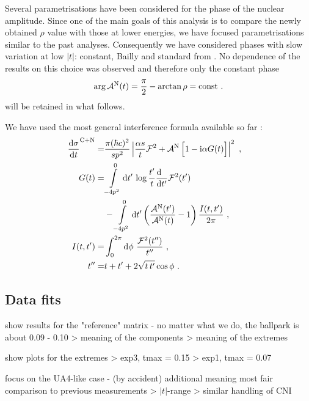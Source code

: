 Several parametrisations have been considered for the phase of the nuclear amplitude. Since one of the main goals of this analysis is to compare the newly obtained $\rho$ value with those at lower energies, we have focused parametrisations similar to the past analyses. Consequently we have considered phases with slow variation at low $|t|$: constant, Bailly and standard from \cite{totem-8tev-1km}. No dependence of the results on this choice was observed and therefore only the constant phase
\begin{equation}
\label{eq:nuc phase con}
\arg {\cal A}^{\rm N}(t) = {\pi\over 2} - \arctan\rho = \hbox{const} \ .
\end{equation}
will be retained in what follows. 

We have used the most general interference formula available so far \cite{kl94}:
\begin{equation}
\label{eq:int kl}
	\begin{aligned}
		{\d\sigma\over \d t}^{\rm C+N} =& {\pi (\hbar c)^2 \over s p^2} \left | {\alpha s\over t} {\cal F}^2
			+ {\cal A}^{\rm N}\, \Big[1 - \I\alpha G(t)\Big] \right |^2\ ,\cr
		G(t) =& \int\limits_{-4p^2}^0 \d t'\, \log {t'\over t} {\d\phantom{t'}\over \d t'} {\cal F}^2(t')\cr
			  &- \int\limits_{-4p^2}^0 \d t' \left( {{\cal A}^{\rm N}(t') \over {\cal A}^{\rm N}(t)} - 1 \right) { I(t, t')\over 2\pi }\ , \cr
		I(t, t') =& \int_0^{2\pi} \d\phi\ {{\cal F}^2(t'')\over t''}\ ,\cr
		t'' =& t + t' + 2\sqrt{t\, t'} \cos\phi\ .\cr
	\end{aligned}
\end{equation}


\subsection{Data fits}
\label{sec:rho anal}


\bgroup
\parskip=0pt

\> show results for the "reference" matrix - no matter what we do, the ballpark is about 0.09 - 0.10
\>> meaning of the components
\>> meaning of the extremes

\> show plots for the extremes
\>> exp3, tmax = 0.15
\>> exp1, tmax = 0.07

\> focus on the UA4-like case - (by accident) additional meaning most fair comparison to previous measurements
\>> $|t|$-range
\>> similar handling of CNI

